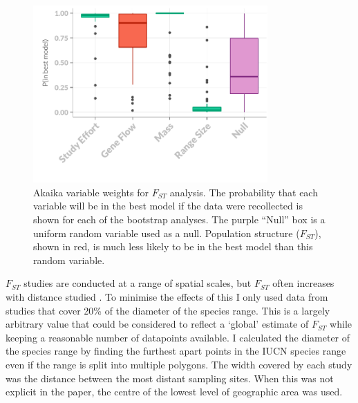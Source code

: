 \begin{knitrout}\footnotesize
{}\color{fgcolor}\begin{figure}[t]

{\centering \includegraphics[width=0.8\textwidth]{figure/fstITPlots-1} 

}

\caption[Akaika variable weights for $F_{ST}$ analysis.]{Akaika variable weights for $F_{ST}$ analysis. The probability that each variable will be in the best model if the data were recollected is shown for each of the bootstrap analyses. The purple ``Null'' box is a uniform random variable used as a null. Population structure ($F_{ST}$), shown in red, is much less likely to be in the best model than this random variable.}\label{fig:fstITPlots}
\end{figure}


\end{knitrout}












$F_{ST}$ studies are conducted at a range of spatial scales, but $F_{ST}$ often increases with distance studied \cite{}.
To minimise the effects of this I only used data from studies that cover 20\% of the diameter of the species range.
This is a largely arbitrary value that could be considered to reflect a `global' estimate of $F_{ST}$ while keeping a reasonable number of datapoints available.
I calculated the diameter of the species range by finding the furthest apart points in the IUCN species range \cite{} even if the range is split into multiple polygons.
The width covered by each study was the distance between the most distant sampling sites.
When this was not explicit in the paper, the centre of the lowest level of geographic area was used.



